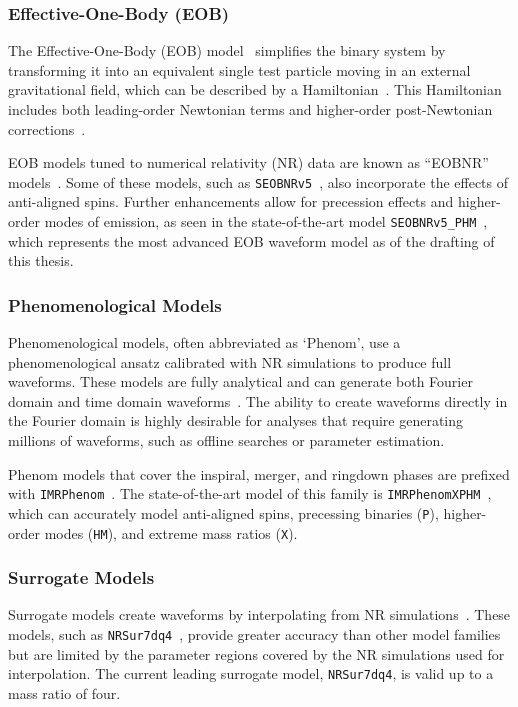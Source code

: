 \subsubsection{Effective-One-Body (EOB)}

The Effective-One-Body (EOB) model~\cite{EOB_1:1998} simplifies the binary system by transforming it into an equivalent single test particle moving in an external gravitational field, which can be described by a Hamiltonian~\cite{EOB_1:1998, EOB_2:2000, EOB_3:2000, EOB_4:2001}. This Hamiltonian includes both leading-order Newtonian terms and higher-order post-Newtonian corrections~\cite{EOB_5:2008}.

EOB models tuned to numerical relativity (NR) data are known as ``EOBNR'' models~\cite{EOB_6:2007}. Some of these models, such as \texttt{SEOBNRv5}~\cite{SEOBNRv5:2023tna}, also incorporate the effects of anti-aligned spins. Further enhancements allow for precession effects and higher-order modes of \gwadj emission, as seen in the state-of-the-art model \texttt{SEOBNRv5\_PHM}~\cite{SEOBNRv5_PHM-Buades:2023ehm}, which represents the most advanced EOB waveform model as of the drafting of this thesis.

\subsubsection{Phenomenological Models}

Phenomenological models, often abbreviated as `Phenom', use a phenomenological ansatz calibrated with NR simulations to produce full waveforms. These models are fully analytical and can generate both Fourier domain and time domain waveforms~\cite{IMR_1:2007, IMR_2:2020}. The ability to create waveforms directly in the Fourier domain is highly desirable for analyses that require generating millions of waveforms, such as offline searches or parameter estimation.

Phenom models that cover the inspiral, merger, and ringdown phases are prefixed with \texttt{IMRPhenom}~\cite{IMRPhenomD:2009}. The state-of-the-art model of this family is \texttt{IMRPhenomXPHM}~\cite{IMRPhenomXPHM:2020}, which can accurately model anti-aligned spins, precessing binaries (\texttt{P}), higher-order modes (\texttt{HM}), and extreme mass ratios (\texttt{X}).

\subsubsection{Surrogate Models}

Surrogate models create waveforms by interpolating from NR simulations~\cite{Surr_1:2019, Surr_2:2022}. These models, such as \texttt{NRSur7dq4}~\cite{NRSur7dq4:2019}, provide greater accuracy than other model families but are limited by the parameter regions covered by the NR simulations used for interpolation. The current leading surrogate model, \texttt{NRSur7dq4}, is valid up to a mass ratio of four.
